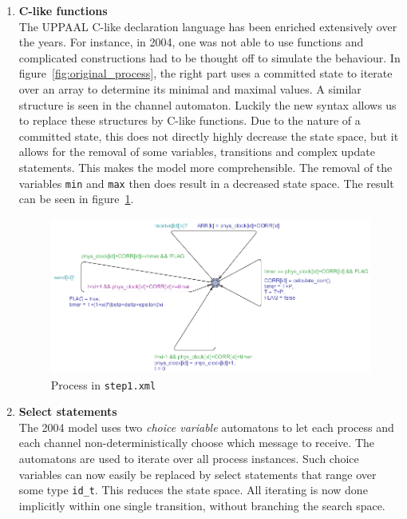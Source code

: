 \documentclass[a4paper,10pt]{article}
\newcommand{\UPPAAL}{UPPAAL\xspace}
\begin{document}
\begin{enumerate}
\item \textbf{C-like functions} \\
	The \UPPAAL C-like declaration language has been enriched extensively over the years. For instance, in 2004, one was not able to use functions and complicated constructions had to be thought off to simulate the behaviour. In figure~\ref{fig:original_process}, the right part uses a committed state to iterate over an array to determine its minimal and maximal values. A similar structure is seen in the channel automaton. Luckily the new syntax allows us to replace these structures by C-like functions. Due to the nature of a committed state, this does not directly highly decrease the state space, but it allows for the removal of some variables, transitions and complex update statements. This makes the model more comprehensible. The removal of the variables \texttt{min} and \texttt{max} then does result in a decreased state space. The result can be seen in figure~\ref{fig:step1_process}.

\begin{figure}[!h]
\includegraphics[width=\textwidth]{step1_process}
\caption{Process in \texttt{step1.xml}\label{fig:step1_process}}
\end{figure}

\item \textbf{Select statements} \\
	The 2004 model uses two \textit{choice variable} automatons to let each process and each channel non-deterministically choose which message to receive. The automatons are used to iterate over all process instances. Such choice variables can now easily be replaced by select statements that range over some type \texttt{id\_t}. This reduces the state space. All iterating is now done implicitly within one single transition, without branching the search space.


\end{enumerate}
\end{document}
